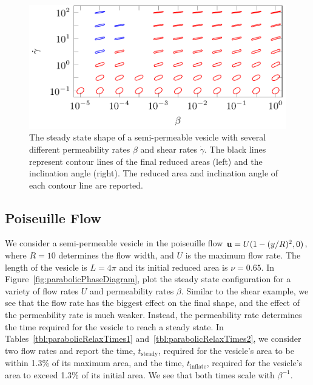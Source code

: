 \documentclass[9pt,twocolumn,twoside,lineno]{pnas-new}
\newif\ifTikz
\begin{document}
\begin{figure}[htp]
  \centering
  \includegraphics[width=\linewidth]{figures/shearPhaseDiagramRA2.pdf}
  \caption{\label{fig:shearPhaseDiagram} The steady state shape of a
  semi-permeable vesicle with several different permeability rates
  $\beta$ and shear rates $\dot{\gamma}$. The black lines represent
  contour lines of the final reduced areas (left) and the inclination
  angle (right). The reduced area and inclination angle of each contour
  line are reported.}
\end{figure}

\subsection*{Poiseuille Flow}
We consider a semi-permeable vesicle in the poiseuille flow $\mathbf{u} =
U(1-(y/R)^2,0)$, where $R=10$ determines the flow width, and $U$ is the
maximum flow rate. The length of the vesicle is $L = 4\pi$ and its
initial reduced area is $\nu = 0.65$. In
Figure~\ref{fig:parabolicPhaseDiagram}, plot the steady state
configuration for a variety of flow rates $U$ and permeability rates
$\beta$. Similar to the shear example, we see that the flow rate has the
biggest effect on the final shape, and the effect of the permeability
rate is much weaker. Instead, the permeability rate determines the time
required for the vesicle to reach a steady state. In
Tables~\ref{tbl:parabolicRelaxTimes1}
and~\ref{tbl:parabolicRelaxTimes2}, we consider two flow rates and
report the time, $t_\mathrm{steady}$, required for the vesicle's area to
be within 1.3\% of its maximum area, and the time, $t_\mathrm{inflate}$,
required for the vesicle's area to exceed 1.3\% of its initial area. We
see that both times scale with $\beta^{-1}$. 
\end{document}

